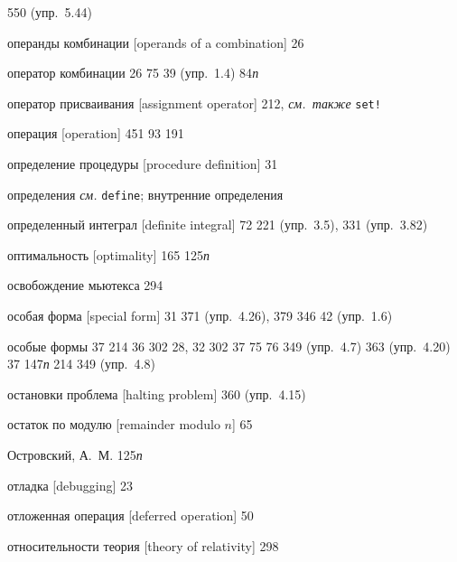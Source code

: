 \begin{theindex}
   550 (упр.~5.44)
\item {операнды комбинации [operands of a combination]} 26
\item {оператор комбинации} 26
   75
   39 (упр.~1.4)
   84{\it п}
\item {оператор присваивания [assignment operator]} 212, {\it см.~также} {\tt set!}
\item {операция [operation]}
   451
   93
   191
\item {определение процедуры [procedure definition]} 31
\item {определения} {\it см.} \texttt{define}; внутренние определения
\item {определенный интеграл [definite integral]} 72
   221 (упр.~3.5), 331 (упр.~3.82)
\item {оптимальность [optimality]}
   165
   125{\it п}
\item {освобождение мьютекса} 294
\item {особая форма [special form]} 31
   371 (упр.~4.26), 379
   346
   42 (упр.~1.6)
\item {особые формы}
   37
   214
   36
   302
   28, 32
   302
   37
   75
   76
   349 (упр.~4.7)
   363 (упр.~4.20)
   37
   147{\it п}
   214
   349 (упр.~4.8)
\item {остановки проблема [halting problem]} 360 (упр.~4.15)
\item {остаток по модулю [remainder modulo $n$]} 65
\item {Островский, А.~М.} 125{\it п}
\item {отладка [debugging]} 23
\item {отложенная операция [deferred operation]} 50
\item {относительности теория [theory of relativity]} 298

\end{theindex}
